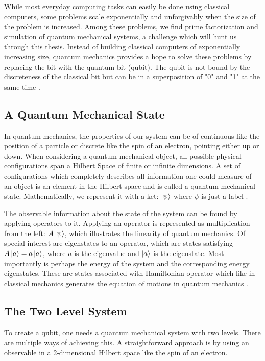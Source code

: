 While most everyday computing tasks can easily be done using classical computers, some problems scale exponentially and unforgivably when the size of the problem is increased. Among these problems, we find prime factorization and simulation of quantum mechanical systems, a challenge which will hunt us through this thesis. Instead of building classical computers of exponentially increasing size, quantum mechanics provides a hope to solve these problems by replacing the bit with the quantum bit (qubit). The qubit is not bound by the discreteness of the classical bit but can be in a superposition of "0" and "1" at the same time \cite{krantz_week_2019}.

\subsection{A Quantum Mechanical State}
In quantum mechanics, the properties of our system can be of continuous like the position of a particle or discrete like the spin of an electron, pointing either up or down. When considering a quantum mechanical object, all possible physical configurations span a Hilbert Space of finite or infinite dimensions. A set of configurations which completely describes all information one could measure of an object is an element in the Hilbert space and is called a quantum mechanical state. Mathematically, we represent it with a ket: $\ket{\psi}$ where $\psi$ is just a label \cite{sakurai_modern_2021}.

The observable information about the state of the system can be found by applying operators to it. Applying an operator is represented as multiplication from the left: $A\ket{\psi}$, which illustrates the linearity of quantum mechanics. Of special interest are eigenstates to an operator, which are states satisfying $A\ket{a} = a \ket{a}$, where $a$ is the eigenvalue and $\ket{a}$ is the eigenstate. Most importantly is perhaps the energy of the system and the corresponding energy eigenstates. These are states associated with Hamiltonian operator which like in classical mechanics generates the equation of motions in quantum mechanics \cite{sakurai_modern_2021}.

\subsection{The Two Level System}\label{sec:tls}
To create a qubit, one needs a quantum mechanical system with two levels. There are multiple ways of achieving this. A straightforward approach is by using an observable in a 2-dimensional Hilbert space like the spin of an electron.  

